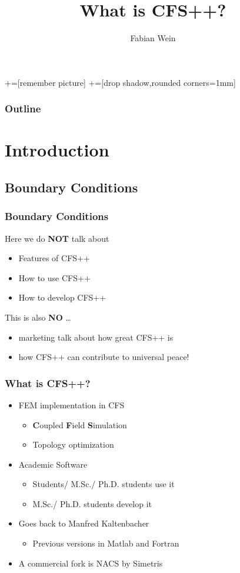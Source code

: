 \documentclass{beamer}
\title{What is CFS++?}
\author{Fabian Wein}
\begin{document}
+=[remember picture]
+=[drop shadow,rounded corners=1mm]


\begin{frame}
\titlepage
\end{frame}

\begin{frame}
\frametitle{Outline}
\tableofcontents
\end{frame}


\section{Introduction}

\subsection{Boundary Conditions}

\begin{frame}
\frametitle{Boundary Conditions}

Here we do \textbf{NOT} talk about 
\begin{itemize}
  \item Features of CFS++
  \item How to use CFS++
  \item How to develop CFS++
\end{itemize}
This is also \textbf{NO} \ldots
\begin{itemize}
  \item marketing talk about how great CFS++ is
  \item how CFS++ can contribute to universal peace!
\end{itemize}

\end{frame}


\begin{frame}
\frametitle{What is CFS++?}
\begin{itemize}
  \item FEM implementation in CFS
  \begin{itemize}
    \item \textbf{C}oupled \textbf{F}ield \textbf{S}imulation
    \item Topology optimization
  \end{itemize}  
  \item Academic Software
    \begin{itemize}
      \item Students/ M.Sc./ Ph.D. students use it 
      \item M.Sc./ Ph.D. students develop it
    \end{itemize}  
  \item Goes back to Manfred Kaltenbacher
    \begin{itemize}
    \item Previous versions in Matlab and Fortran 
  \end{itemize}  
  \item A commercial fork is NACS by Simetris 
\end{itemize}
\end{frame}
\end{document}
